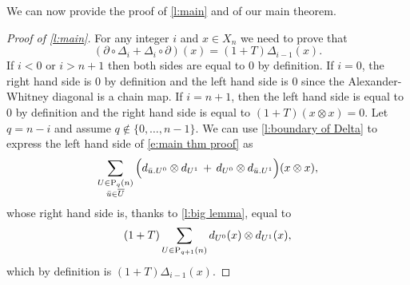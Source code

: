 We can now provide the proof of \cref{l:main} and of our main theorem.

\begin{proof}[Proof of \cref{l:main}]
	For any integer $i$ and $x \in X_n$ we need to prove that
	\begin{equation} \label{e:main thm proof}
	(\partial \circ \Delta_{i} + \Delta_{i} \circ \partial)(x) = (1 + T) \Delta_{i-1}(x).
	\end{equation}
	If $i < 0$ or $i > n+1$ then both sides are equal to $0$ by definition.
	If $i = 0$, the right hand side is $0$ by definition and the left hand side is $0$ since the Alexander-Whitney diagonal is a chain map.
	If $i = n+1$, then the left hand side is equal to $0$ by definition and the right hand side is equal to $(1+T) (x \otimes x) = 0$.
	Let $q = n-i$ and assume $q \not\in \{0, \dots, n-1\}$.
	We can use \cref{l:boundary of Delta} to express the left hand side of \eqref{e:main thm proof} as
	\begin{equation*}
	\sum_{\substack{U \in \P_{q}(n) \\ \bu \in \overline{U}}} \Big( d_{\bu.U^0} \otimes d_{U^1} \, + \, d_{U^0} \otimes d_{\bu.U^1} \Big) (x \otimes x),
	\end{equation*}
	whose right hand side is, thanks to \cref{l:big lemma}, equal to
	\begin{equation*}
	(1+T) \sum_{U \in \P_{q+1}(n)} d_{U^0}(x) \otimes d_{U^1}(x),
	\end{equation*}
	which by definition is $(1+T)\Delta_{i-1}(x)$.
\end{proof}